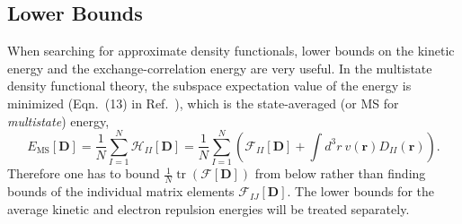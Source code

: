 \documentclass[journal=jpclcd,manuscript=letter]{achemso}
\DeclareMathOperator{\tr}{tr}
\newcommand\m[1]{\mathbf{#1}}
\renewcommand\vec[1]{\mathbf{#1}}
\begin{document}
\subsection{Lower Bounds}
\label{sec:lower_bounds}
When searching for approximate density functionals, lower bounds on the kinetic energy and the exchange-correlation energy
are very useful. In the multistate density functional theory, the subspace expectation value of the energy is minimized
(Eqn.~(13) in Ref.~\cite{Lu2022JPCL}), which is the state-averaged (or MS for \emph{multistate}) energy,
\begin{equation}
  E_{\text{MS}}[\m{D}] = \frac{1}{N} \sum_{I=1}^{N} \mathcal{H}_{II}[\m{D}]
  = \frac{1}{N} \sum_{I=1}^{N} \left( \mathcal{F}_{II}[\m{D}] + \int d^3r ~ v(\vec{r}) D_{II}(\vec{r}) \right).
\end{equation}
Therefore one has to bound $\frac{1}{N} \tr(\mathcal{F}[\m{D}])$ from below rather than finding bounds of
the individual matrix elements $\mathcal{F}_{IJ}[\m{D}]$. The lower bounds for the average kinetic and electron repulsion energies
will be treated separately.
\end{document}
